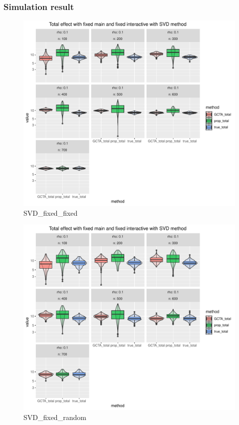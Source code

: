 \documentclass[]{article}
\begin{document}
\subsubsection{Simulation result}\label{simulation-result}

\begin{figure}
\centering
\includegraphics{./graphs/plot_chi_fixed_fixed_total_p_34_rho_0.1_0.9_n_100_700_svd_dim_red.pdf}
\caption{SVD\_fixed\_fixed}
\end{figure}

\begin{figure}
\centering
\includegraphics{./graphs/plot_chi_fixed_random_total_p_34_rho_0.1_0.9_n_100_700_svd_dim_red.pdf}
\caption{SVD\_fixed\_random}
\end{figure}
\end{document}
